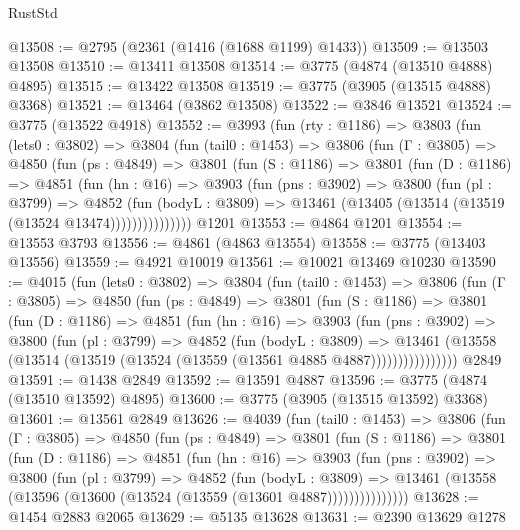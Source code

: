 \begin{lexlean}{RustStd}
\begin{coremodule}
@13508 := @2795 (@2361 (@1416 (@1688 @1199) @1433))
@13509 := @13503 @13508
@13510 := @13411 @13508
@13514 := @3775 (@4874 (@13510 @4888) @4895)
@13515 := @13422 @13508
@13519 := @3775 (@3905 (@13515 @4888) @3368)
@13521 := @13464 (@3862 @13508)
@13522 := @3846 @13521
@13524 := @3775 (@13522 @4918)
@13552 := @3993
    (fun (rty : @1186) =>
    @3803
      (fun (lets0 : @3802) =>
      @3804
        (fun (tail0 : @1453) =>
        @3806
          (fun (Γ : @3805) =>
          @4850
            (fun (ps : @4849) =>
            @3801
              (fun (S : @1186) =>
              @3801
                (fun (D : @1186) =>
                @4851
                  (fun (hn : @16) =>
                  @3903
                    (fun (pns : @3902) =>
                    @3800
                      (fun (pl : @3799) =>
                      @4852
                        (fun (bodyL : @3809) =>
                        @13461 (@13405 (@13514 (@13519 (@13524 @13474)))))))))))))))
    @1201
@13553 := @4864 @1201
@13554 := @13553 @3793
@13556 := @4861 (@4863 @13554)
@13558 := @3775 (@13403 @13556)
@13559 := @4921 @10019
@13561 := @10021 @13469 @10230
@13590 := @4015
    (fun (lets0 : @3802) =>
    @3804
      (fun (tail0 : @1453) =>
      @3806
        (fun (Γ : @3805) =>
        @4850
          (fun (ps : @4849) =>
          @3801
            (fun (S : @1186) =>
            @3801
              (fun (D : @1186) =>
              @4851
                (fun (hn : @16) =>
                @3903
                  (fun (pns : @3902) =>
                  @3800
                    (fun (pl : @3799) =>
                    @4852
                      (fun (bodyL : @3809) =>
                      @13461
                        (@13558 (@13514 (@13519 (@13524 (@13559 (@13561 @4885 @4887))))))))))))))))
    @2849
@13591 := @1438 @2849
@13592 := @13591 @4887
@13596 := @3775 (@4874 (@13510 @13592) @4895)
@13600 := @3775 (@3905 (@13515 @13592) @3368)
@13601 := @13561 @2849
@13626 := @4039
    (fun (tail0 : @1453) =>
    @3806
      (fun (Γ : @3805) =>
      @4850
        (fun (ps : @4849) =>
        @3801
          (fun (S : @1186) =>
          @3801
            (fun (D : @1186) =>
            @4851
              (fun (hn : @16) =>
              @3903
                (fun (pns : @3902) =>
                @3800
                  (fun (pl : @3799) =>
                  @4852
                    (fun (bodyL : @3809) =>
                    @13461 (@13558 (@13596 (@13600 (@13524 (@13559 (@13601 @4887)))))))))))))))
@13628 := @1454 @2883 @2065
@13629 := @5135 @13628
@13631 := @2390 @13629 @1278

\end{coremodule}
\end{lexlean}
